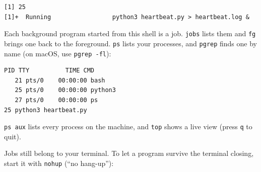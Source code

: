 \begin{codeblock}
\begin{Verbatim}[formatcom=\outputstyle]
[1] 25
[1]+  Running                 python3 heartbeat.py > heartbeat.log &
\end{Verbatim}
\end{codeblock}


Each background program started from this shell is a job. \texttt{jobs} lists them and \texttt{fg} brings one back to the foreground. \texttt{ps} lists your processes, and \texttt{pgrep} finds one by name (on macOS, use \texttt{pgrep\ -fl}):

\begin{codeblock}

\begin{Shaded}
\begin{Highlighting}[]
 
\end{Highlighting}
\end{Shaded}

\end{codeblock}

\begin{codeblock}
\begin{Verbatim}[formatcom=\outputstyle]
  PID TTY          TIME CMD
   21 pts/0    00:00:00 bash
   25 pts/0    00:00:00 python3
   27 pts/0    00:00:00 ps
25 python3 heartbeat.py
\end{Verbatim}
\end{codeblock}

\texttt{ps\ aux} lists every process on the machine, and \texttt{top} shows a live view (press \texttt{q} to quit).


Jobs still belong to your terminal. To let a program survive the terminal closing, start it with \texttt{nohup} (``no hang-up''):

\begin{codeblock}

\begin{Shaded}
\begin{Highlighting}[]
\OperatorTok{\textgreater{}}\OperatorTok{\textgreater{}\&} \KeywordTok{\&}
\end{Highlighting}
\end{Shaded}

\end{codeblock}


